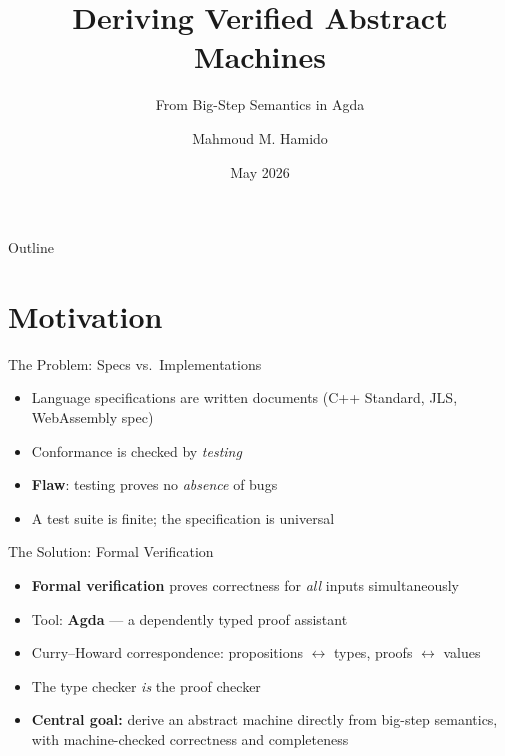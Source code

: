 \documentclass[10pt,compress,aspectratio=169]{beamer}
\title{Deriving Verified Abstract Machines}
\subtitle{From Big-Step Semantics in Agda}
\date[May 2026]{May 2026}
\author[M.\,Hamido]{Mahmoud M. Hamido}
\institute[]{Department of Computer Science\\RPTU Kaiserslautern-Landau}
\begin{document}
\maketitle

\begin{frame}{Outline}
  \tableofcontents
\end{frame}

\section{Motivation}

\begin{frame}{The Problem: Specs vs.\ Implementations}
  \begin{itemize}
    \item Language specifications are written documents (C++ Standard, JLS, WebAssembly spec)
    \item Conformance is checked by \emph{testing}
    \bigskip
    \item \textbf{Flaw}: testing proves no \emph{absence} of bugs
    \item A test suite is finite; the specification is universal
  \end{itemize}
\end{frame}

\begin{frame}{The Solution: Formal Verification}
  \begin{itemize}
    \item \textbf{Formal verification} proves correctness for \emph{all} inputs simultaneously
    \item Tool: \textbf{Agda} — a dependently typed proof assistant
    \bigskip
    \item Curry–Howard correspondence: propositions $\leftrightarrow$ types, proofs $\leftrightarrow$ values
    \item The type checker \emph{is} the proof checker
    \bigskip
    \item \textbf{Central goal:} derive an abstract machine directly from big-step semantics, with machine-checked correctness and completeness
  \end{itemize}
\end{frame}
\end{document}
